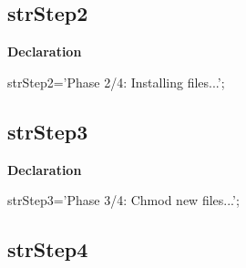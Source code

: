 \documentclass{report}
\newif\ifpdf
\begin{document}
\subsection*{strStep2}
\fi
\label{trstrings-strStep2}
\begin{list}{}{
\setlength{\itemindent}{0cm}
\setlength{\listparindent}{0cm}
\setlength{\leftmargin}{\evensidemargin}
\addtolength{\leftmargin}{\tmplength}
\settowidth{\labelsep}{X}
\addtolength{\leftmargin}{\labelsep}
\setlength{\labelwidth}{\tmplength}
}
\item[\textbf{Declaration}\hfill]
\ifpdf
\begin{flushleft}
\fi
\begin{ttfamily}
strStep2='Phase 2/4: Installing files...';\end{ttfamily}

\ifpdf
\end{flushleft}
\fi

\end{list}
\ifpdf
\subsection*{\large{\textbf{strStep3}}\normalsize\hspace{1ex}\hrulefill}
\else
\subsection*{strStep3}
\fi
\label{trstrings-strStep3}
\begin{list}{}{
\setlength{\itemindent}{0cm}
\setlength{\listparindent}{0cm}
\setlength{\leftmargin}{\evensidemargin}
\addtolength{\leftmargin}{\tmplength}
\settowidth{\labelsep}{X}
\addtolength{\leftmargin}{\labelsep}
\setlength{\labelwidth}{\tmplength}
}
\item[\textbf{Declaration}\hfill]
\ifpdf
\begin{flushleft}
\fi
\begin{ttfamily}
strStep3='Phase 3/4: Chmod new files...';\end{ttfamily}

\ifpdf
\end{flushleft}
\fi

\end{list}
\ifpdf
\subsection*{\large{\textbf{strStep4}}\normalsize\hspace{1ex}\hrulefill}
\else
\end{document}
